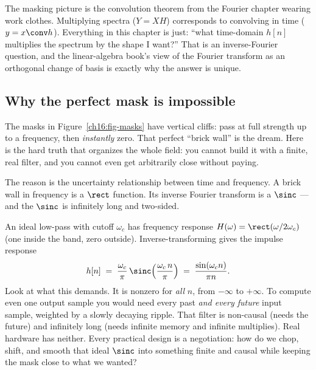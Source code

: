 \begin{connectionbox}
The masking picture is the convolution theorem from the Fourier chapter wearing
work clothes. Multiplying spectra ($Y = XH$) corresponds to convolving in time
($y = x \conv h$). Everything in this chapter is just: ``what time-domain $h[n]$
multiplies the spectrum by the shape I want?'' That is an inverse-Fourier
question, and the linear-algebra book's view of the Fourier transform as an
orthogonal change of basis is exactly why the answer is unique.
\end{connectionbox}

\subsection{Why the perfect mask is impossible}
\label{ch16:why-impossible}

The masks in Figure~\ref{ch16:fig-masks} have vertical cliffs: pass at full
strength up to a frequency, then \emph{instantly} zero. That perfect ``brick
wall'' is the dream. Here is the hard truth that organizes the whole field: you
cannot build it with a finite, real filter, and you cannot even get arbitrarily
close without paying.

The reason is the uncertainty relationship between time and frequency. A brick
wall in frequency is a $\rect$ function. Its inverse Fourier transform is a
$\sinc$ --- and the $\sinc$ is infinitely long and two-sided.

\begin{whybox}
An ideal low-pass with cutoff $\omega_c$ has frequency response
$H(\omega) = \rect(\omega/2\omega_c)$ (one inside the band, zero outside).
Inverse-transforming gives the impulse response
\[
h[n] \;=\; \frac{\omega_c}{\pi}\,\sinc\!\left(\frac{\omega_c\, n}{\pi}\right)
       \;=\; \frac{\sin(\omega_c n)}{\pi n}.
\]
Look at what this demands. It is nonzero for \emph{all} $n$, from $-\infty$ to
$+\infty$. To compute even one output sample you would need every past
\emph{and every future} input sample, weighted by a slowly decaying ripple. That
filter is non-causal (needs the future) and infinitely long (needs infinite
memory and infinite multiplies). Real hardware has neither. Every practical
design is a negotiation: how do we chop, shift, and smooth that ideal $\sinc$
into something finite and causal while keeping the mask close to what we wanted?
\end{whybox}

